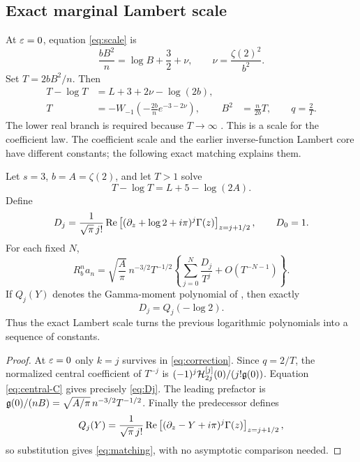 \subsection{Exact marginal Lambert scale}

At $\varepsilon=0$, equation \eqref{eq:scale} is
\[
 \frac{bB^2}{n}=\log B+\frac32+\nu,
 \qquad \nu=\frac{\zeta(2)^2}{b^2}.
\]
Set $T=2bB^2/n$. Then
\begin{align}
 T-\log T&=L+3+2\nu-\log(2b),\label{eq:Lambert-scale}\\
 T&=-W_{-1}\left(-\frac{2b}{n}e^{-3-2\nu}\right),
 &B^2&=\frac n{2b}T,\qquad q=\frac2T.
       \label{eq:Lambert-explicit}
\end{align}
The lower real branch is required because $T\to\infty$
\cite{dlmf-lambert}. This is a scale for the coefficient law.
The coefficient scale and the earlier inverse-function Lambert core
have different constants; the following exact matching explains them.

\begin{corollary}
\label{cor:marginal}
Let $s=3$, $b=A=\zeta(2)$, and let $T>1$ solve
\begin{equation}\label{eq:critical-T}
 T-\log T=L+5-\log(2A).
\end{equation}
Define
\begin{equation}\label{eq:Dj}
 D_j=\frac1{\sqrt\pi\,j!}
   \operatorname{Re}\left[(\partial_z+\log2+i\pi)^j\Gamma(z)
                                  \right]_{z=j+1/2},
 \qquad D_0=1.
\end{equation}
For each fixed $N$,
\begin{equation}\label{eq:marginal-T-series}
 R_b^n a_n=\sqrt{\frac A\pi}\,n^{-3/2}T^{-1/2}
       \left\{\sum_{j=0}^N\frac{D_j}{T^j}
                     +O(T^{-N-1})\right\}.
\end{equation}
If $Q_j(Y)$ denotes the Gamma-moment polynomial of
\cite{repo-moments}, then exactly
\begin{equation}\label{eq:matching}
 D_j=Q_j(-\log2).
\end{equation}
Thus the exact Lambert scale turns the previous logarithmic
polynomials into a sequence of constants.
\end{corollary}

\begin{proof}
At $\varepsilon=0$ only $k=j$ survives in \eqref{eq:correction}.
Since $q=2/T$, the normalized central coefficient of $T^{-j}$ is
$(-1)^j\mathcal H_{2j}^{[j]}(0)/(j!\mathfrak g(0))$.
Equation \eqref{eq:central-C} gives precisely \eqref{eq:Dj}.
The leading prefactor is
$\mathfrak g(0)/(nB)=\sqrt{A/\pi}\,n^{-3/2}T^{-1/2}$.
Finally the predecessor defines
\[
 Q_j(Y)=\frac1{\sqrt\pi\,j!}\operatorname{Re}\left[
             (\partial_z-Y+i\pi)^j\Gamma(z)
                                  \right]_{z=j+1/2},
\]
so substitution gives \eqref{eq:matching}, with no asymptotic
comparison needed.
\end{proof}

